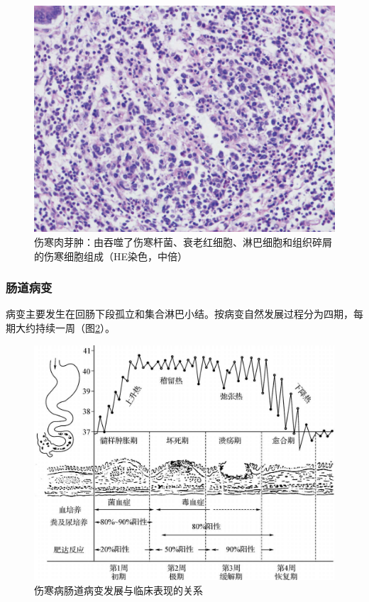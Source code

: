 \begin{figure}[!htbp]
    \centering
    \includegraphics{./images/Image00236.jpg}
    \captionsetup{justification=centering}
    \caption{伤寒肉芽肿：由吞噬了伤寒杆菌、衰老红细胞、淋巴细胞和组织碎屑的伤寒细胞组成（HE染色，中倍）}
    \label{fig14-11}
\end{figure}

\subsubsection{肠道病变}

病变主要发生在回肠下段孤立和集合淋巴小结。按病变自然发展过程分为四期，每期大约持续一周（图\ref{fig14-12}）。

\begin{figure}[!htbp]
    \centering
    \includegraphics[width=.6\textwidth]{./images/Image00237.jpg}
    \captionsetup{justification=centering}
    \caption{伤寒病肠道病变发展与临床表现的关系}
    \label{fig14-12}
\end{figure}

